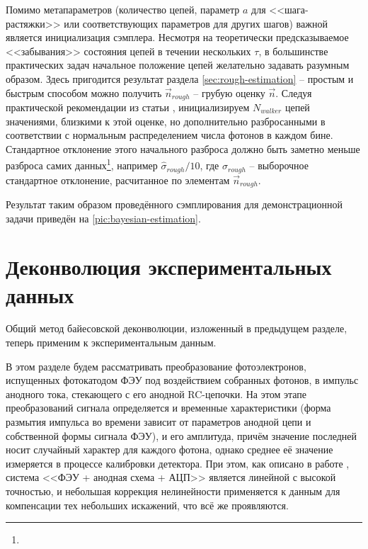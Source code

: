 \documentclass[12pt]{book}
\begin{document}
	Помимо метапараметров (количество цепей, параметр $a$ для <<шага-растяжки>> или соответствующих параметров для других шагов) важной является инициализация сэмплера. Несмотря на теоретически предсказываемое <<забывания>> состояния цепей в течении нескольких $\tau$, в большинстве практических задач начальное положение цепей желательно задавать разумным образом. Здесь пригодится результат раздела \ref{sec:rough-estimation} -- простым и быстрым способом можно получить $\vec{n}_{rough}$ -- грубую оценку $\vec{n}$. Следуя практической рекомендации из статьи \cite{ForemanMackey2016}, инициализируем $N_{walker}$ цепей значениями, близкими к этой оценке, но дополнительно разбросанными в соответствии с нормальным распределением числа фотонов в каждом бине. Стандартное отклонение этого начального разброса должно быть заметно меньше разброса самих данных\footnote{}, например $\hat{\sigma}_{rough} / 10$, где $\hat{\sigma}_{rough}$ -- выборочное стандартное отклонение, расчитанное по элементам $\vec{n}_{rough}$.
	
	Результат таким образом проведённого сэмплирования для демонстрационной задачи приведён на \ref{pic:bayesian-estimation}.



	\section{Деконволюция экспериментальных данных}
	
	Общий метод байесовской деконволюции, изложенный в предыдущем разделе, теперь применим к экспериментальным данным.
	
	В этом разделе будем рассматривать преобразование фотоэлектронов, испущенных фотокатодом ФЭУ под воздействием собранных фотонов, в импульс анодного тока, стекающего с его анодной RC-цепочки. На этом этапе преобразований сигнала определяется и временные характеристики (форма размытия импульса во времени зависит от параметров анодной цепи и собственной формы сигнала ФЭУ), и его амплитуда, причём значение последней носит случайный характер для каждого фотона, однако среднее её значение измеряется в процессе калибровки детектора. При этом, как описано в работе \cite{Sphere2015}, система <<ФЭУ + анодная схема + АЦП>> является линейной с высокой точностью, и небольшая коррекция нелинейности применяется к данным для компенсации тех небольших искажений, что всё же проявляются.
\end{document}
